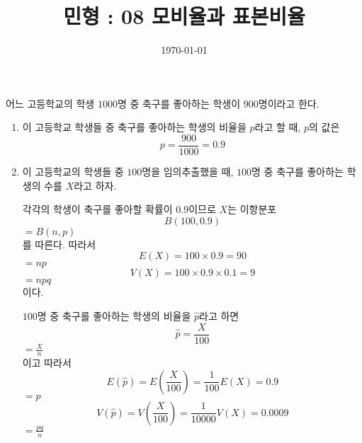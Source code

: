 \documentclass{oblivoir}
\newcounter{num}
\begin{document}
\title{민형 : 08 모비율과 표본비율}
\author{}
\date{\today}
\maketitle

어느 고등학교의 학생 \(1000\)명 중 축구를 좋아하는 학생이 \(900\)명이라고 한다.
\begin{enumerate}
\item
이 고등학교 학생들 중 축구를 좋아하는 학생의 비율을 \(p\)라고 할 때, \(p\)의 값은
\[p=\frac{900}{1000}=0.9\]
\item
이 고등학교의 학생들 중 \(100\)명을 임의추출했을 때, \(100\)명 중 축구를 좋아하는 학생의 수를 \(X\)라고 하자.
%

각각의 학생이 축구를 좋아할 확률이 \(0.9\)이므로 \(X\)는 이항분포
\[B(100,0.9)\]
\vspace{-23pt}\(=B(n,p)\)\\
를 따른다.
따라서
\[E(X)=100\times0.9=90\]
\vspace{-24pt}\(=np\)
\[V(X)=100\times0.9\times0.1=9\]
\vspace{-31pt}\(=npq\)\\
이다.

\(100\)명 중 축구를 좋아하는 학생의 비율을 \(\hat p\)라고 하면
\[\hat p=\frac X{100}\]
\vspace{-28pt}\(=\frac Xn\)\\
이고 따라서
\[E(\hat p)=E\left(\frac X{100}\right)=\frac1{100}E(X)=0.9\]
\vspace{-25pt}\(=p\)\\
\[V(\hat p)=V\left(\frac X{100}\right)=\frac1{10000}V(X)=0.0009\]
\vspace{-25pt}\(=\frac{pq}n\)\\
\end{enumerate}

\thispagestyle{empty}
\end{document}

